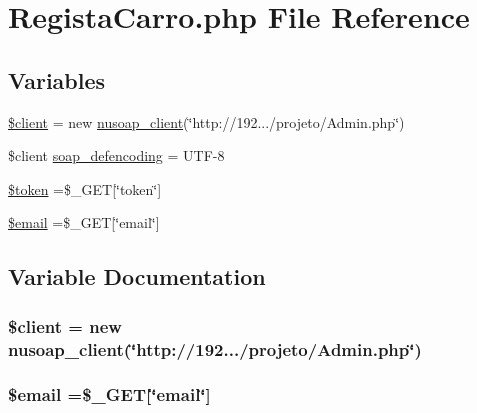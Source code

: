 \hypertarget{_regista_carro_8php}{}\section{Regista\+Carro.\+php File Reference}
\label{_regista_carro_8php}
\subsection*{Variables}
\begin{DoxyCompactItemize}
\item 
\hyperlink{_regista_carro_8php_ad1405dc1ba2e288764378e79bff7a87d}{\$client} = new \hyperlink{classnusoap__client}{nusoap\+\_\+client}(\char`\"{}http\+://192.../projeto/Admin.\+php\char`\"{})
\item 
\$client \hyperlink{_regista_carro_8php_a944cce1b9c1aa5e93c77ace20ce99989}{soap\+\_\+defencoding} = \textquotesingle{}U\+T\+F-\/8\textquotesingle{}
\item 
\hyperlink{_regista_carro_8php_a00ae4fcafb1145f5e968bdf920f83e2e}{\$token} =\$\+\_\+\+G\+E\+T\mbox{[}\char`\"{}token\char`\"{}\mbox{]}
\item 
\hyperlink{_regista_carro_8php_ad634f418b20382e2802f80532d76d3cd}{\$email} =\$\+\_\+\+G\+E\+T\mbox{[}\char`\"{}email\char`\"{}\mbox{]}
\end{DoxyCompactItemize}


\subsection{Variable Documentation}
\hypertarget{_regista_carro_8php_ad1405dc1ba2e288764378e79bff7a87d}{}
\subsubsection[{\$client}]{\setlength{\rightskip}{0pt plus 5cm}\$client = new {\bf nusoap\+\_\+client}(\char`\"{}http\+://192.../projeto/Admin.\+php\char`\"{})}\label{_regista_carro_8php_ad1405dc1ba2e288764378e79bff7a87d}
\hypertarget{_regista_carro_8php_ad634f418b20382e2802f80532d76d3cd}{}
\subsubsection[{\$email}]{\setlength{\rightskip}{0pt plus 5cm}\$email =\$\+\_\+\+G\+E\+T\mbox{[}\char`\"{}email\char`\"{}\mbox{]}}\label{_regista_carro_8php_ad634f418b20382e2802f80532d76d3cd}
\hypertarget{_regista_carro_8php_a00ae4fcafb1145f5e968bdf920f83e2e}{}
